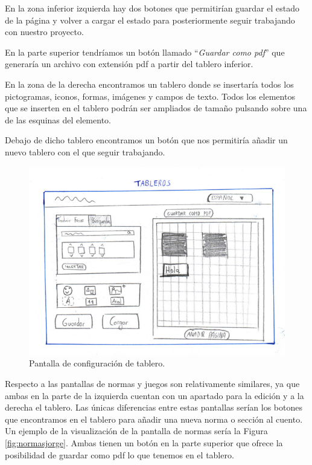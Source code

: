 	
	En la zona inferior izquierda hay dos botones que permitirían guardar el estado de la página y volver a cargar el estado para posteriormente seguir trabajando con nuestro proyecto.
	
	En la parte superior tendríamos un botón llamado “\textit{Guardar como pdf}” que generaría un archivo con extensión pdf a partir del tablero inferior.
	
	
	En la zona de la derecha encontramos un tablero donde se insertaría todos los pictogramas, iconos, formas, imágenes y campos de texto. Todos los elementos que se inserten en el tablero podrán ser ampliados de tamaño pulsando sobre una de las esquinas del elemento.
	
	
	Debajo de dicho tablero encontramos un botón que nos permitiría añadir un nuevo tablero con el que seguir trabajando.
	
	
	
	\begin{figure}[h!]
		\centering
		\includegraphics[width=0.7\linewidth]{Imagenes/Bitmap/tablerosJorge}
		\caption{Pantalla de configuración de tablero.}
		\label{fig:tablerosjorge}
	\end{figure}
	
	
	

	Respecto a las pantallas de normas y juegos son relativamente similares, ya que ambas en la parte de la izquierda cuentan con un apartado para la edición y a la derecha el tablero. Las únicas diferencias entre estas pantallas serían los botones que encontramos en el tablero para añadir una nueva norma o sección al cuento. Un ejemplo de la visualización de la pantalla de normas sería la Figura \ref{fig:normasjorge}. Ambas tienen un botón en la parte superior que ofrece la posibilidad de guardar como pdf lo que tenemos en el tablero.
	
